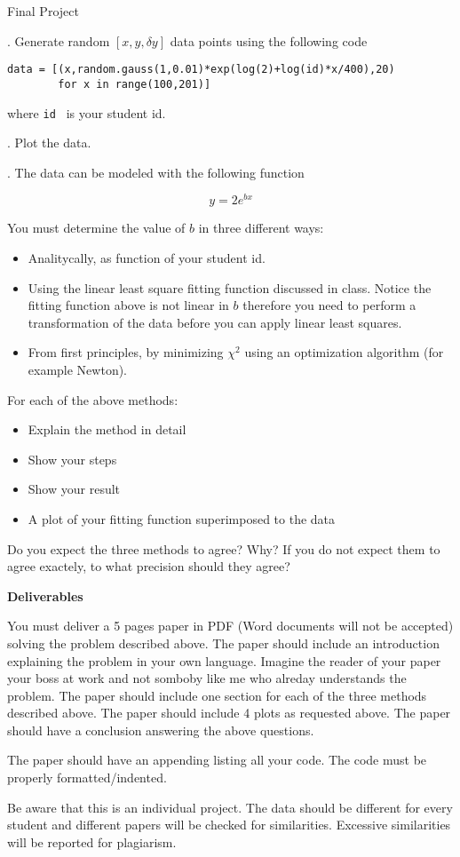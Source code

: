 \documentclass[12pt]{article}
\begin{document}
{\LARGE Final Project }


. Generate random $[x,y,\delta y]$ data points using the following code

\begin{verbatim}
data = [(x,random.gauss(1,0.01)*exp(log(2)+log(id)*x/400),20) 
        for x in range(100,201)]
\end{verbatim}

\noindent where {\tt id } is your student id.

. Plot the data.

. The data can be modeled with the following function

\[
y = 2 e^{b x}
\]

\noindent You must determine the value of $b$ in three different ways:

\begin{itemize}
\item Analitycally, as function of your student id.
\item Using the linear least square fitting function discussed in class. Notice the fitting function above is not linear in $b$ therefore you need to perform a transformation of the data before you can apply linear least squares.
\item From first principles, by minimizing $\chi^2$ using an optimization algorithm (for example Newton).
\end{itemize}

For each of the above methods:
\begin{itemize}
\item Explain the method in detail
\item Show your steps
\item Show your result
\item A plot of your fitting function superimposed to the data
\end{itemize}

\noindent Do you expect the three methods to agree? Why? If you do not expect them to agree exactely, to what precision should they agree?

{\bf Deliverables}

You must deliver a 5 pages paper in PDF (Word documents will not be accepted) solving the problem described above. The paper should include an introduction explaining the problem in your own language. Imagine the reader of your paper your boss at work and not somboby like me who alreday understands the problem. The paper should include one section for each of the three methods described above. The paper should include 4 plots as requested above. The paper should have a conclusion answering the above questions.

The paper should have an appending listing all your code. The code must be properly formatted/indented.

Be aware that this is an individual project. The data should be different for every student and different papers will be checked for similarities. Excessive similarities will be reported for plagiarism.
\end{document}

